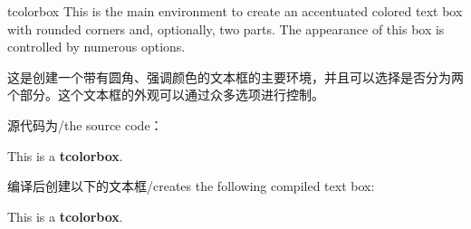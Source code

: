 \begin{docEnvironment}{tcolorbox}{}
This is the main environment to create an accentuated colored text box with
rounded corners and, optionally, two parts. The appearance of this box
is controlled by numerous options.

这是创建一个带有圆角、强调颜色的文本框的主要环境，并且可以选择是否分为两个部分。这个文本框的外观可以通过众多选项进行控制。%






\begin{tcolorbox}[title={在最简单的情况下/In the most simple case，}, before skip=\baselineskip,after skip=\baselineskip,sidebyside]
源代码为/the source code：
\begin{dispListing}
\begin{tcolorbox}
This is a \textbf{tcolorbox}.
\end{tcolorbox}
\end{dispListing}
\tcblower
编译后创建以下的文本框/creates the following compiled text box:
\begin{tcolorbox}
This is a \textbf{tcolorbox}.
\end{tcolorbox}
\end{tcolorbox}



\end{docEnvironment}
